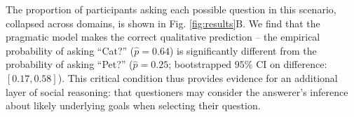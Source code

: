 \documentclass[12pt, floatsintext, jou]{apa6}
\begin{document}
The proportion of participants asking each possible question in this scenario, collapsed across domains, is shown in Fig. \ref{fig:results}B. We find that the pragmatic model makes the correct qualitative prediction -- the empirical probability of asking ``Cat?'' ($\hat{p} = 0.64$) is significantly different from the  probability of asking ``Pet?'' ($\hat{p} = 0.25$; bootstrapped $95\%$ CI on difference: $[0.17, 0.58]$). This critical condition thus provides evidence for an additional layer of social reasoning: that questioners may consider the answerer's inference about likely underlying goals when selecting their question. 

%

\end{document}
